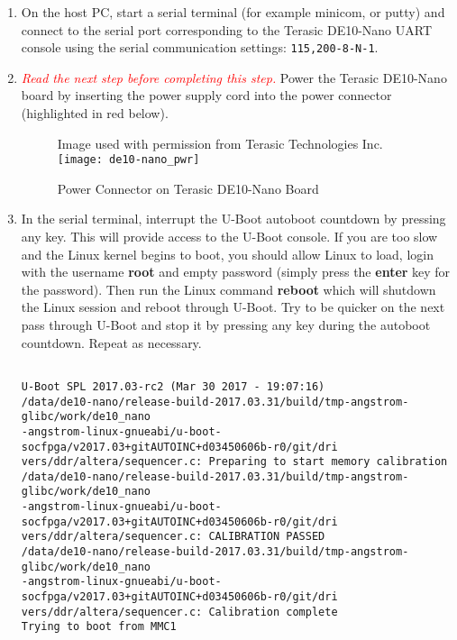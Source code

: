 \begin{flushleft}
\begin{enumerate}[
	label=\textbf{Step \arabic*.},
	leftmargin=*,
	widest={00},
	align=left]
\newpage

\item On the host PC, start a serial terminal (for example minicom, or putty) and connect to the serial port corresponding to the Terasic DE10-Nano UART console using the serial communication settings: \texttt{115,200-8-N-1}.

\item \textcolor{red}{\emph{Read the next step before completing this step.}} Power the Terasic DE10-Nano board by inserting the power supply cord into the power connector (highlighted in red below).

\begin{figure}[H]
\centering
\scriptsize{Image used with permission from Terasic Technologies Inc.}
\newline
\texttt{[image: de10-nano\_pwr]}
\caption{Power Connector on Terasic DE10-Nano Board}
\label{fig:de10-nano_pwr}
\end{figure}

\item In the serial terminal, interrupt the U-Boot autoboot countdown by pressing any key. This will provide access to the U-Boot console.  If you are too slow and the Linux kernel begins to boot, you should allow Linux to load, login with the username \textbf{root} and empty password (simply press the \textbf{enter} key for the password).  Then run the Linux command \textbf{reboot} which will shutdown the Linux session and reboot through U-Boot.  Try to be quicker on the next pass through U-Boot and stop it by pressing any key during the autoboot countdown.  Repeat as necessary.

\begin{verbatim}

U-Boot SPL 2017.03-rc2 (Mar 30 2017 - 19:07:16)
/data/de10-nano/release-build-2017.03.31/build/tmp-angstrom-glibc/work/de10_nano
-angstrom-linux-gnueabi/u-boot-socfpga/v2017.03+gitAUTOINC+d03450606b-r0/git/dri
vers/ddr/altera/sequencer.c: Preparing to start memory calibration
/data/de10-nano/release-build-2017.03.31/build/tmp-angstrom-glibc/work/de10_nano
-angstrom-linux-gnueabi/u-boot-socfpga/v2017.03+gitAUTOINC+d03450606b-r0/git/dri
vers/ddr/altera/sequencer.c: CALIBRATION PASSED
/data/de10-nano/release-build-2017.03.31/build/tmp-angstrom-glibc/work/de10_nano
-angstrom-linux-gnueabi/u-boot-socfpga/v2017.03+gitAUTOINC+d03450606b-r0/git/dri
vers/ddr/altera/sequencer.c: Calibration complete
Trying to boot from MMC1



\end{verbatim}
\end{enumerate}
\end{flushleft}
